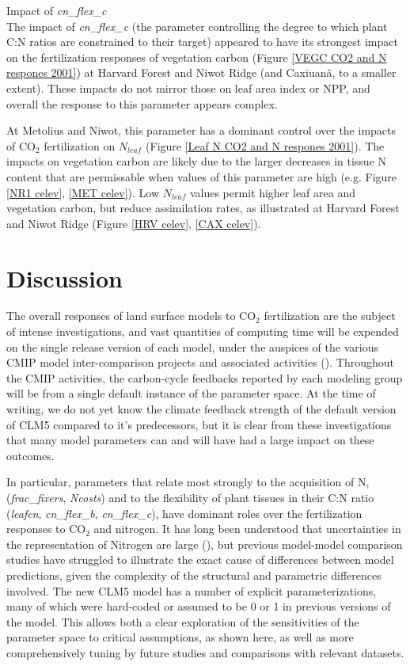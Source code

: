 \documentclass[draft,linenumbers]{agujournal}
\begin{document}
Impact of \emph{cn\_flex\_c}\\
The impact of \emph{cn\_flex\_c} (the parameter controlling the degree to which plant C:N ratios are constrained to their target) appeared to have its strongest impact on the fertilization responses of vegetation carbon (Figure \ref{VEGC CO2 and N respones 2001})  at Harvard Forest and Niwot Ridge (and Caxiuan\~a, to a smaller extent). These impacts do not mirror those on leaf area index or NPP, and overall the response to this parameter appears complex. 

At Metolius and Niwot, this parameter has a dominant control over the impacts of CO$_{2}$ fertilization on $N_{leaf}$ (Figure \ref{Leaf N CO2 and N respones 2001}).  The impacts on vegetation carbon are likely due to the larger decreases in tissue N content that are permissable when values of this parameter are high (e.g. Figure \ref{NR1 celev}, \ref{MET celev}).  Low  $N_{leaf}$ values permit higher leaf area and vegetation carbon, but reduce assimilation rates, as illustrated at Harvard Forest and Niwot Ridge (Figure \ref{HRV celev}, \ref{CAX celev}).  

\section{Discussion}
The overall responses of land surface models to CO$_{2}$ fertilization are the subject of intense investigations, and vast quantities of computing time will be expended on the single release version of each model, under the auspices of the various CMIP model inter-comparison projects and associated activities  (\cite{meehl2014}).  Throughout the CMIP activities, the carbon-cycle feedbacks reported by each modeling group will be from a single default instance of the parameter space. At the time of writing, we do not yet know the climate feedback strength of the default version of CLM5 compared to it's predecessors, but it is clear from these investigations that many model parameters can and will have had a large impact on these outcomes.  

In particular, parameters that relate most strongly to the acquisition of N, (\emph{frac\_fixers}, \emph{Ncosts}) and to the flexibility of plant tissues in their C:N ratio (\emph{leafcn}, \emph{cn\_flex\_b}, \emph{cn\_flex\_c}), have dominant roles over the fertilization responses to CO$_{2}$ and nitrogen.  It has long been understood that uncertainties in the representation of Nitrogen are large (\cite{zaehle2014}), but previous model-model comparison studies have struggled to illustrate the exact cause of differences between model predictions, given the complexity of the structural and parametric differences involved. The new CLM5 model has a number of explicit parameterizations, many of which were hard-coded or assumed to be 0 or 1 in previous versions of the model. This allows both a clear exploration of the sensitivities of the parameter space to critical assumptions, as shown here, as well as more comprehensively tuning by future studies and comparisons with relevant datasets. 
\end{document}

